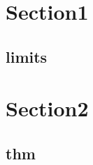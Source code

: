 \section{Section1}
    \subsection{limits}
        

\section{Section2}
    \subsection{thm}
        